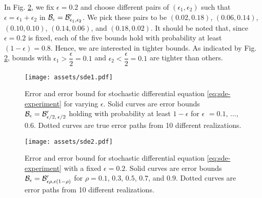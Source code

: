     In Fig. \ref{fig:sde-bound-2}, we fix $\epsilon=0.2$ and choose different pairs of $(\epsilon_1, \epsilon_2)$ such that $\epsilon = \epsilon_1 + \epsilon_2$ in $\mathcal{B}_{\epsilon} = \mathcal{B}'_{\epsilon_1, \epsilon_2}$. 
    We pick these pairs to be $(0.02, 0.18)$, $(0.06, 0.14)$, $(0.10, 0.10)$, $(0.14, 0.06)$, and $(0.18, 0.02)$.
    It should be noted that, since $\epsilon=0.2$ is fixed, each of the five bounds hold with probability at least $(1-\epsilon) = 0.8$.
    Hence, we are interested in tighter bounds.
    As indicated by Fig. \ref{fig:sde-bound-2}, bounds with $\epsilon_1 > \dfrac{\epsilon}{2} = 0.1$ and $\epsilon_2 < \dfrac{\epsilon}{2} = 0.1$ are tighter than others.


    \makeatletter
    \setlength{\@fptop}{0pt}
    \begin{figure}[!ht]
        \centering
        \texttt{[image: assets/sde1.pdf]}
        \caption{
            Error and error bound for stochastic differential equation \eqref{eq:sde-experiment} for varying $\epsilon$. 
            Solid curves are error bounds $\mathcal{B}_{\epsilon} = \mathcal{B}'_{\epsilon/2, \, \epsilon/2}$ holding with probability at least $1-\epsilon$ for $\epsilon$ $=0.1$, $\dots$, $0.6$.
            Dotted curves are true error paths from 10 different realizations. 
        }\label{fig:sde-bound-1}
    \end{figure}
    \makeatother

    \makeatletter
    \setlength{\@fptop}{0pt}
    \begin{figure}[!ht]
        \centering
        \texttt{[image: assets/sde2.pdf]}
        \caption{
            Error and error bound for stochastic differential equation \eqref{eq:sde-experiment} with a fixed $\epsilon=0.2$. 
            Solid curves are error bounds $\mathcal{B}_{\epsilon} = \mathcal{B}'_{\epsilon\rho, \epsilon(1-\rho)}$ for $\rho=0.1$, $0.3$, $0.5$, $0.7$, and $0.9$. 
            Dotted curves are error paths from 10 different realizations. 
        }\label{fig:sde-bound-2}
    \end{figure}
    \makeatother